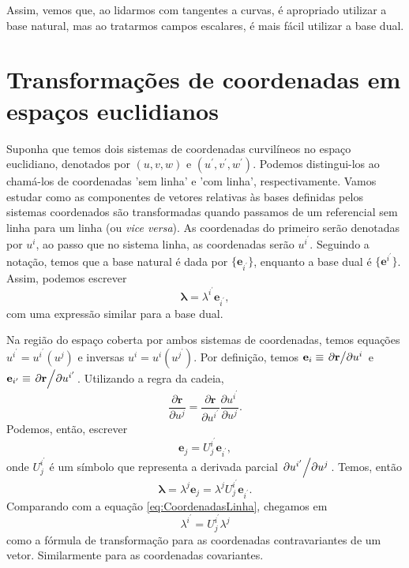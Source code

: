 Assim, vemos que, ao lidarmos com tangentes a curvas, é apropriado utilizar a base natural, mas ao tratarmos campos escalares, é mais fácil utilizar a base dual.


\section{Transformações de coordenadas em espaços euclidianos}\label{sec:TransformacoesCoordenadas}

Suponha que temos dois sistemas de coordenadas curvilíneos no espaço euclidiano, denotados por $(u,v,w)$ e $(u^\prime,v^\prime,w^\prime)$. Podemos distingui-los ao chamá-los de coordenadas 'sem linha' e 'com linha', respectivamente. Vamos estudar como as componentes de vetores relativas às bases definidas pelos sistemas coordenados são transformadas quando passamos de um referencial sem linha para um linha (ou \textit{vice versa}). As coordenadas do primeiro serão denotadas por $u^i$, ao passo que no sistema linha, as coordenadas serão $u^{i^\prime}$. Seguindo a notação, temos que a base natural é dada por $\{\mathbf{e}_{i^\prime}\}$, enquanto a base dual é $\{\mathbf{e}^{i^\prime}\}$. Assim, podemos escrever
\begin{equation}\label{eq:CoordenadasLinha}
	\boldsymbol{\lambda}=\lambda^{i^\prime}\mathbf{e}_{i^\prime} , 
\end{equation}
com uma expressão similar para a base dual.

Na região do espaço coberta por ambos sistemas de coordenadas, temos equações $u^{i^{\prime}}=u^{i^{\prime}}\left(u^{j}\right)$ e inversas $u^{i}=u^{i}\left(u^{j^\prime}\right)$. Por definição, temos $\mathbf{e}_i \equiv \pdv*{\mathbf{r}}{u^i}$ e $\mathbf{e}_{i^\prime} \equiv \pdv*{\mathbf{r}}{u^{i^\prime}}$. Utilizando a regra da cadeia,
\[
	\frac{\partial \mathbf{r}}{\partial u^{j}}=\frac{\partial \mathbf{r}}{\partial u^{i^{\prime}}} \frac{\partial u^{i^{\prime}}}{\partial u^{j}}.
\]
Podemos, então, escrever
\begin{equation}\label{eq:TransformadaContravarianteBase}
	\mathbf{e}_j = U^{i^\prime}_j \mathbf{e}_{i^\prime}, 
\end{equation}
onde $U^{i^\prime}_j $ é um símbolo que representa a derivada parcial $\pdv*{u^{i^\prime}}{u^j}$. Temos, então
\[
	\boldsymbol{\lambda}=\lambda^{j} \mathbf{e}_{j}=\lambda^{j} U_{j}^{i^{\prime}} \mathbf{e}_{i^{\prime}}.
\]
Comparando com a equação \eqref{eq:CoordenadasLinha}, chegamos em
\begin{equation}\label{eq:TransformadaCoordenadasContravariante}
	\boxed{
		\lambda^{i^\prime} = U^{i^\prime}_j \lambda^j
	}
\end{equation}
como a fórmula de transformação para as coordenadas contravariantes de um vetor. Similarmente para as coordenadas covariantes.

